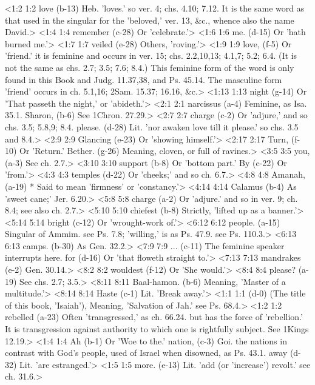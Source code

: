 <1:2 1:2  love (b-13)  Heb. 'loves.' so ver. 4; chs. 4.10; 7.12. It is the same word  as that used in the singular for the 'beloved,' ver. 13, &c.,  whence also the name David.>
<1:4 1:4  remember (c-28)  Or 'celebrate.'>
<1:6 1:6  me. (d-15)  Or 'hath burned me.'>
<1:7 1:7  veiled (e-28)  Others, 'roving.'>
<1:9 1:9  love, (f-5)  Or 'friend.' it is feminine and occurs in ver. 15; chs.  2.2,10,13; 4.1,7; 5.2; 6.4. (It is not the same as chs. 2.7;  3.5; 7.6; 8.4.) This feminine form of the word is only found in  this Book and Judg. 11.37,38, and Ps. 45.14. The masculine form  'friend' occurs in ch. 5.1,16; 2Sam. 15.37; 16.16, &c.>
<1:13 1:13  night (g-14)  Or 'That passeth the night,' or 'abideth.'>
<2:1 2:1  narcissus (a-4)  Feminine, as Isa. 35.1.
  Sharon, (b-6)  See 1Chron. 27.29.>
<2:7 2:7  charge (c-2)  Or 'adjure,' and so chs. 3.5; 5.8,9; 8.4.
  please. (d-28)  Lit. 'nor awaken love till it please.' so chs. 3.5 and 8.4.>
<2:9 2:9  Glancing (e-23)  Or 'showing himself.'>
<2:17 2:17  Turn, (f-10)  Or 'Return.'
  Bether. (g-26)  Meaning, cloven, or full of ravines.>
<3:5 3:5  you, (a-3)  See ch. 2.7.>
<3:10 3:10  support (b-8)  Or 'bottom part.'
  By (c-22)  Or 'from.'>
<4:3 4:3  temples (d-22)  Or 'cheeks;' and so ch. 6.7.>
<4:8 4:8  Amanah, (a-19)  * Said to mean 'firmness' or 'constancy.'>
<4:14 4:14  Calamus (b-4)  As 'sweet cane;' Jer. 6.20.>
<5:8 5:8  charge (a-2)  Or 'adjure.' and so in ver. 9; ch. 8.4; see also ch. 2.7.>
<5:10 5:10  chiefest (b-8)  Strictly, 'lifted up as a banner.'>
<5:14 5:14  bright (c-12)  Or 'wrought-work of.'>
<6:12 6:12  people. (a-15)  Singular of Ammim. see Ps. 7.8; 'willing,' is as Ps. 47.9.  see Ps. 110.3.>
<6:13 6:13  camps. (b-30)  As Gen. 32.2.>
<7:9 7:9  ... (c-11)  The feminine speaker interrupts here.
  for (d-16)  Or 'that floweth straight to.'>
<7:13 7:13  mandrakes (e-2)  Gen. 30.14.>
<8:2 8:2  wouldest (f-12)  Or 'She would.'>
<8:4 8:4  please? (a-19)  See chs. 2.7; 3.5.>
<8:11 8:11  Baal-hamon. (b-6)  Meaning, 'Master of a multitude.'>
<8:14 8:14  Haste (c-1)  Lit. 'Break away.'>
<1:1 1:1   (d-0)  (The title of this book, 'Isaiah'), Meaning, 'Salvation of  Jah.' see Ps. 68.4.>
<1:2 1:2  rebelled (a-23)  Often 'transgressed,' as ch. 66.24. but has the force of  'rebellion.' It is transgression against authority to which one  is rightfully subject. See 1Kings 12.19.>
<1:4 1:4  Ah (b-1)  Or 'Woe to the.'
  nation, (c-3)  Goi. the nations in contrast with God's people, used of  Israel when disowned, as Ps. 43.1.
  away (d-32)  Lit. 'are estranged.'>
<1:5 1:5  more. (e-13)  Lit. 'add (or 'increase') revolt.' see ch. 31.6.>
